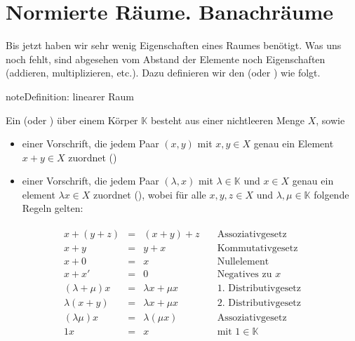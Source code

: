 \documentclass[letterpaper,10pt,english]{jupyterBook}
\begin{document}
\section{Normierte Räume. Banachräume}
\label{\detokenize{Funktionalanalysis/GrundlegendeRaeume:normierte-raume-banachraume}}
Bis jetzt haben wir sehr wenig Eigenschaften eines Raumes benötigt. Was uns noch fehlt, sind abgesehen vom Abstand der Elemente noch  Eigenschaften (addieren, multiplizieren, etc.). Dazu definieren wir den  (oder ) wie folgt.

\begin{sphinxadmonition}{note}{Definition: linearer Raum}

Ein  (oder ) über einem Körper \(\mathbb{K}\) besteht aus einer nichtleeren Menge \(X\), sowie
\begin{itemize}
\item {} 
einer Vorschrift, die jedem Paar \((x,y)\) mit \(x,y \in X\) genau ein Element \(x+y\in X\) zuordnet ()

\item {} 
einer Vorschrift, die jedem Paar \((\lambda,x)\) mit \(\lambda\in \mathbb{K}\) und \(x \in X\) genau ein element \(\lambda x\in X\) zuordnet (), wobei für alle \(x,y,z \in X\) und \(\lambda, \mu\in\mathbb{K}\) folgende Regeln gelten:

\end{itemize}
\begin{equation*}
\begin{split}\begin{array}{rcll}
x + (y+z) & = & (x+y) + z & \quad\text{Assoziativgesetz} \\
x + y & = & y + x & \quad\text{Kommutativgesetz} \\
x + 0 & = & x & \quad\text{Nullelement} \\
x + x' & = & 0 & \quad\text{Negatives zu $x$}\\
(\lambda + \mu) x & = &  \lambda x + \mu x & \quad\text{1. Distributivgesetz}\\
\lambda (x+y) & = &  \lambda x + \mu x & \quad\text{2. Distributivgesetz}\\
(\lambda \mu) x & = & \lambda (\mu x) & \quad\text{Assoziativgesetz}\\
1 x & = & x & \quad\text{mit $1\in\mathbb{K}$}
\end{array}\end{split}
\end{equation*}\end{sphinxadmonition}
\end{document}
